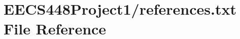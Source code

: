 \hypertarget{references_8txt}{}\section{E\+E\+C\+S448\+Project1/references.txt File Reference}
\label{references_8txt}
